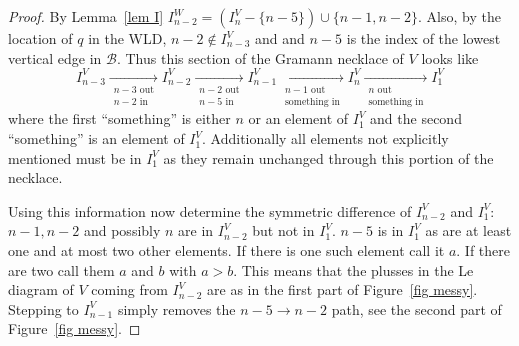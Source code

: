\documentclass[11pt]{article}
\theoremstyle{remark}
\theoremstyle{definition}
\begin{document}
\begin{proof}
  By Lemma~\ref{lem I} $I_{n-2}^{W}= (I_{n}^{V} - \{n-5\})\cup \{n-1,n-2\}$.  Also, by the location of $q$ in the WLD,  $n-2\not\in I_{n-3}^{V}$ and and $n-5$ is the index of the lowest vertical edge in $\mathcal{B}$.  Thus this section of the Gramann necklace of $V$ looks like
  \begin{equation}\label{eq necklace}
  I_{n-3}^{V} \underset{\substack{n-3\text{ out}\\n-2\text{ in}}}{\rightarrow} I_{n-2}^{V} \underset{\substack{n-2\text{ out}\\n-5\text{ in}}}{\rightarrow} I_{n-1}^{V} \underset{\substack{n-1\text{ out}\\\text{something in}}}{\rightarrow} I_{n}^{V} \underset{\substack{n \text{ out}\\\text{something in}}}{\rightarrow} I_1^{V}
  \end{equation}
  where the first ``something'' is either $n$ or an element of $I_1^{V}$ and the second ``something'' is an element of $I_1^{V}$.  Additionally all elements not explicitly mentioned must be in $I_1^{V}$ as they remain unchanged through this portion of the necklace.

  Using this information now determine the symmetric difference of $I_{n-2}^{V}$ and $I_1^{V}$: $n-1, n-2$ and possibly $n$ are in $I_{n-2}^{V}$ but not in $I_1^{V}$.  $n-5$ is in $I_1^{V}$ as are at least one and at most two other elements.  If there is one such element call it $a$.  If there are two call them $a$ and $b$ with $a>b$.  This means that the plusses in the Le diagram of $V$ coming from $I_{n-2}^{V}$ are as in the first part of Figure~\ref{fig messy}.  Stepping to $I_{n-1}^{V}$ simply removes the $n-5\rightarrow n-2$ path, see the second part of Figure~\ref{fig messy}.


\end{proof}
\end{document}
